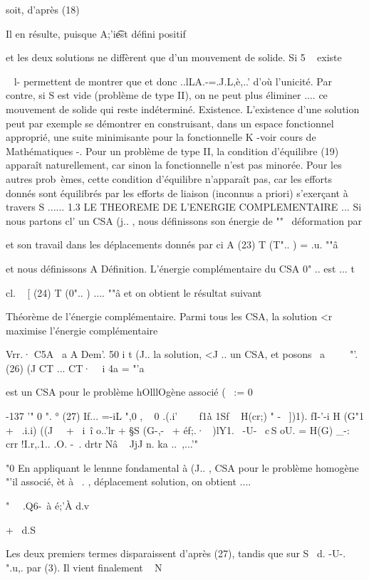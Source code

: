 {{{soit, d'après (18) 

Il en résulte, puisque A;'i\t est défini positif 

et les deux solutions ne diffèrent que d'un mouvement de solide. Si 5 ~ existe 

~ l-
permettent de montrer que 
et donc ..lLA.-=.J.L,è,..' d'où l'unicité. 
Par contre, si S est vide (problème de type II), on ne peut plus éliminer 
.... 
ce mouvement de solide qui reste indéterminé. 
Existence. L'existence d'une solution peut par exemple se démontrer en cons­truisant, dans un espace fonctionnel approprié, une suite minimisante pour 
la fonctionnelle K -voir cours de Mathématiques -. Pour un problème de type II, la condition d'équilibre (19) apparaît naturellement, car sinon la 
fonctionnelle n'est pas minorée. Pour les autres prob~èmes, cette condition 
d'équilibre n'apparaît pas, car les efforts donnés sont équilibrés par les efforts de liaison (inconnus a priori) s'exerçant à travers S ...... 
1.3 LE THEOREME DE L'ENERGIE COMPLEMENTAIRE 
... 
Si nous partons cl' un CSA (j.. , nous définissons son énergie de 
""~ 
déformation par 

et son travail dans les déplacements donnés par 
ci A
(23) T (T".. ) = 
.u. ""â 

et nous définissons 
A 
Définition. L'énergie complémentaire du CSA 0" .. est 
... t 

cl. ~ 
[ (24) 
T (0".. ) 
.... ""â 
et on obtient le résultat suivant 

Théorème de l'énergie complémentaire. Parmi tous les CSA, la solution <r~~ 
maximise l'énergie complémentaire 

Vrr.· C5A 
~a 
A 
Dem'. 50 i t (J.. la solution, <J .. un CSA, et posons 
~a ~~ 
~ 
"'.
(26) (J CT ... CT·  
~i 
4a
= "'a 

est un CSA pour le problème hOlllOgène associé ( ~:= 0 

-137 
'" 0 ".
° 
(27) If... =-iL ",0 , ~ 0 
.(.i'~ ~~ f1\.à 1Sf ~ 
H(cr;) " -~ ])1). fI-'-i H (G"1 + ~.i.i) ((J~~ + ~i~î o..'lr 
+ §S (G-,-~ + éf;.·~ )lY1.~ -U-~ c\,S 
oU. 
= H(G) _-: crr !I.r,.1.. .O. -~. drtr
Nâ ~ JjJ n. ka ..~,...'" 

"0
En appliquant le lennne fondamental à (J.. , CSA pour le problème homogène
"'il associé, èt à ~. , déplacement solution, on obtient 
.... 

" ~~.Q6-~à é;'À d.v 

+ ~d.S 

Les deux premiers termes disparaissent d'après (27), tandis que sur S~ 
d.
-U-. ".u,. par (3). Il vient finalement 
~ N 

}}}
